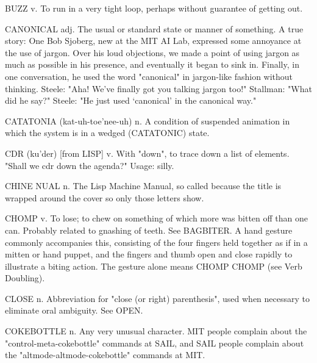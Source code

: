 BUZZ v. To run in a very tight loop, perhaps without guarantee of
   getting out.

CANONICAL adj. The usual or standard state or manner of something.
   A true story:  One Bob Sjoberg, new at the MIT AI Lab, expressed
   some annoyance at the use of jargon.	 Over his loud objections, we
   made a point of using jargon as much as possible in his presence,
   and eventually it began to sink in.	Finally, in one conversation,
   he used the word "canonical" in jargon-like fashion without
   thinking.
   Steele: "Aha!  We've finally got you talking jargon too!"
   Stallman: "What did he say?"
   Steele: "He just used `canonical' in the canonical way."

CATATONIA (kat-uh-toe'nee-uh) n. A condition of suspended animation in
   which the system is in a wedged (CATATONIC) state.

CDR (ku'der) [from LISP] v. With "down", to trace down a list of
   elements.  "Shall we cdr down the agenda?"  Usage: silly.

CHINE NUAL n. The Lisp Machine Manual, so called because the title is
   wrapped around the cover so only those letters show.

CHOMP v. To lose; to chew on something of which more was bitten off
   than one can.  Probably related to gnashing of teeth.  See
   BAGBITER.  A hand gesture commonly accompanies this, consisting of
   the four fingers held together as if in a mitten or hand puppet,
   and the fingers and thumb open and close rapidly to illustrate a
   biting action.  The gesture alone means CHOMP CHOMP (see Verb
   Doubling).

CLOSE n. Abbreviation for "close (or right) parenthesis", used when
   necessary to eliminate oral ambiguity.  See OPEN.

COKEBOTTLE n. Any very unusual character.  MIT people complain about
   the "control-meta-cokebottle" commands at SAIL, and SAIL people
   complain about the "altmode-altmode-cokebottle" commands at MIT.

